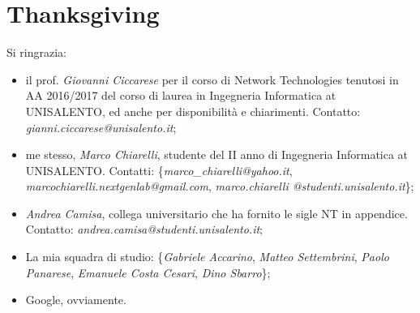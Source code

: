 \documentclass[11 pt,a4paper,twoside,openany]{book}
\begin{document}












\backmatter


\newpage

\section*{Thanksgiving}

Si ringrazia:

\begin{itemize}

\item il prof. \emph{Giovanni Ciccarese} per il corso di Network Technologies tenutosi in AA 2016/2017 del corso di laurea in Ingegneria Informatica at UNISALENTO, ed anche per disponibilità e chiarimenti. Contatto: \emph{gianni.ciccarese@unisalento.it};

\item me stesso, \emph{Marco Chiarelli}, studente del II anno di Ingegneria Informatica at UNISALENTO. Contatti: \{\emph{marco\_chiarelli@yahoo.it}, \emph{marcochiarelli.nextgenlab@gmail.com}, \emph{marco.chiarelli @studenti.unisalento.it}\};

\item \emph{Andrea Camisa}, collega universitario che ha fornito le sigle NT in appendice. Contatto: \emph{andrea.camisa@studenti.unisalento.it};

\item La mia squadra di studio: \{\emph{Gabriele Accarino}, \emph{Matteo Settembrini}, \emph{Paolo Panarese}, \emph{Emanuele Costa Cesari}, \emph{Dino Sbarro}\};

\item Google, ovviamente.

\end{itemize}
\end{document}
